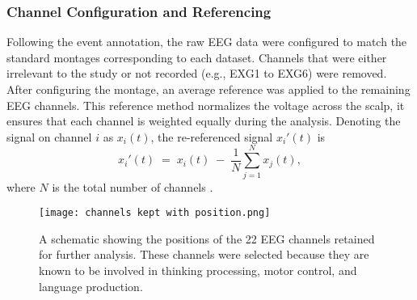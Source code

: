 \documentclass[pdflatex,sn-mathphys-num]{sn-jnl}%
\theoremstyle{thmstyleone}%
\theoremstyle{thmstyletwo}%
\theoremstyle{thmstylethree}%
\begin{document}


\subsubsection{Channel Configuration and Referencing}\label{subsec4}

Following the event annotation, the raw EEG data were configured to match the standard montages corresponding to each dataset. Channels that were either irrelevant to the study or not recorded (e.g., EXG1 to EXG6) were removed. After configuring the montage, an average reference was applied to the remaining EEG channels. This reference method normalizes the voltage across the scalp, it ensures that each channel is weighted equally during the analysis.  Denoting the signal on channel \(i\) as \(x_i(t)\), the re-referenced signal \(x_i'(t)\) is
\[
  x_i'(t)\;=\;x_i(t)\;-\;\frac{1}{N}\sum_{j=1}^{N}x_j(t),
\]
where \(N\) is the total number of channels \cite{Ferree2006}.  

\begin{figure}[H]
    \centering
    \texttt{[image: channels kept with position.png]}
    \caption{A schematic showing the positions of the 22 EEG channels retained for further analysis. These channels were selected because they are known to be involved in thinking processing, motor control, and language production.}
    \label{fig:channels kept with position}
\end{figure}


\end{document}
